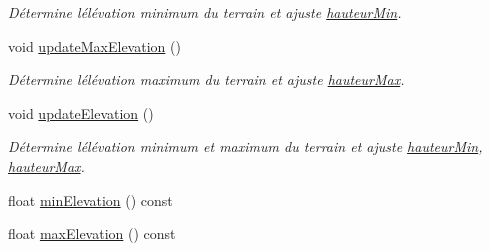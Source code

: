 \begin{DoxyCompactItemize}
\begin{DoxyCompactList}\small\item\em Détermine l\textquotesingle{}élévation minimum du terrain et ajuste \hyperlink{class_terrain_tab_ad8e9ca00da63f66915658151516d10fc}{hauteur\+Min}. \end{DoxyCompactList}\item 
\hypertarget{class_terrain_tab_a65271db7916caf5f8ebddf5aa1ad7021}{}void \hyperlink{class_terrain_tab_a65271db7916caf5f8ebddf5aa1ad7021}{update\+Max\+Elevation} ()\label{class_terrain_tab_a65271db7916caf5f8ebddf5aa1ad7021}

\begin{DoxyCompactList}\small\item\em Détermine l\textquotesingle{}élévation maximum du terrain et ajuste \hyperlink{class_terrain_tab_a6b8b4f7bd611b40d59e8b60e105ce1a8}{hauteur\+Max}. \end{DoxyCompactList}\item 
\hypertarget{class_terrain_tab_a09fcdcde6adeb9c3b51c1368380dbb6b}{}void \hyperlink{class_terrain_tab_a09fcdcde6adeb9c3b51c1368380dbb6b}{update\+Elevation} ()\label{class_terrain_tab_a09fcdcde6adeb9c3b51c1368380dbb6b}

\begin{DoxyCompactList}\small\item\em Détermine l\textquotesingle{}élévation minimum et maximum du terrain et ajuste \hyperlink{class_terrain_tab_ad8e9ca00da63f66915658151516d10fc}{hauteur\+Min}, \hyperlink{class_terrain_tab_a6b8b4f7bd611b40d59e8b60e105ce1a8}{hauteur\+Max}. \end{DoxyCompactList}\item 
float \hyperlink{class_terrain_tab_aa7bc7042c28393faf0813820ab1c1d6f}{min\+Elevation} () const 
\item 
float \hyperlink{class_terrain_tab_abbfa195b063129a3b96e6485cf37ad27}{max\+Elevation} () const 
\end{DoxyCompactItemize}
